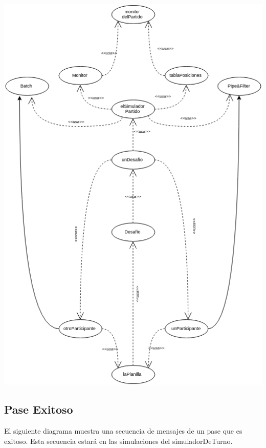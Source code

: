 \includegraphics[width=\textwidth]{imgs/aceptarDesafioObjetos.png}

\subsection{Pase Exitoso}

El siguiente diagrama muestra una secuencia de mensajes de un pase que es exitoso. Esta secuencia estará en las simulaciones del simuladorDeTurno.

